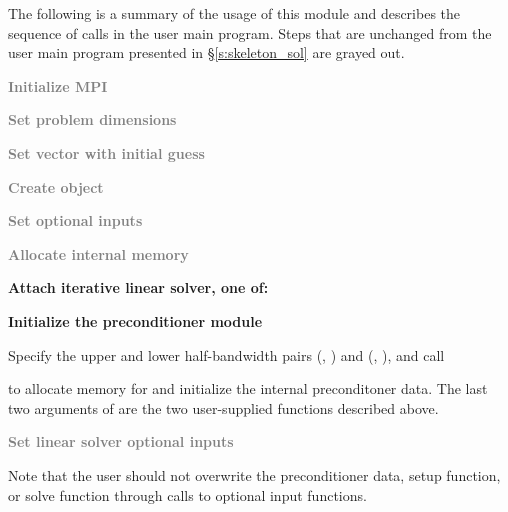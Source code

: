 The following is a summary of the usage of this module and describes the sequence
of calls in the user main program. Steps that are unchanged from the user main
program presented in \S\ref{s:skeleton_sol} are grayed out.
\begin{Steps}
\item 
  \textcolor{gray}{\bf Initialize MPI}

\item
  \textcolor{gray}{\bf Set problem dimensions}

\item
  \textcolor{gray}{\bf Set vector with initial guess}
 
\item
  \textcolor{gray}{\bf Create {\kinsol} object}

\item
  \textcolor{gray}{\bf Set optional inputs}

\item
  \textcolor{gray}{\bf Allocate internal memory}

\item \label{i:bbdpre_attach}
  {\bf Attach iterative linear solver, one of:}





\item \label{i:bbdpre_init}
  {\bf Initialize the {\kinbbdpre} preconditioner module}

  Specify the upper and lower half-bandwidth pairs (, ) and
  (, ), and call


  to allocate memory for and initialize the internal preconditoner data.
  The last two arguments of  are the two user-supplied 
  functions described above.

\item
  \textcolor{gray}{\bf Set linear solver optional inputs}

  Note that the user should not overwrite the preconditioner data, setup function,
  or solve function through calls to {\kinspils} optional input functions.


\end{Steps}
